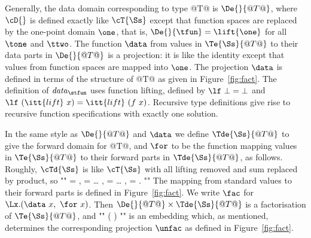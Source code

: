 \documentclass[11pt]{article}
\begin{document}
Generally, the data domain corresponding to type @T@ is $\De{}{@T@}$,
where $\cD{}$ is defined exactly like $\cT{\Ss}$ except that function
spaces are replaced by the one-point domain $\one$, that is,
$\De{}{\tfun}=\lift{\one}$ for all $\tone$ and $\ttwo$.  
The function $\data$ from values in
$\Te{\Ss}{@T@}$ to their data parts in $\De{}{@T@}$ is a projection:
it is like the identity except that values from function spaces are
mapped into $\one$.  The projection $\data$ is defined in terms of the
structure of @T@ as given in Figure~\ref{fig:fact}.
The definition of ${\it{}data}_{\stfun}$ uses function lifting, 
defined by $\lf~\bot=\bot$
and $\lf~(\itt{lift}~x)=\itt{lift}~(f~x)$.  Recursive type definitions
give rise to recursive function specifications with exactly one solution.

In the same style as  $\De{}{@T@}$ and $\data$ we define
$\Tde{\Ss}{@T@}$ to give the forward domain for @T@, and $\for$ to be
the function mapping values in $\Te{\Ss}{@T@}$ to their forward parts
in $\Tde{\Ss}{@T@}$, as follows.  Roughly, $\cTd{\Ss}$ is like
$\cT{\Ss}$ with all lifting removed and sum replaced by product, so
""
	\Tde{\Ss}{\tint} = \one ,\espace
	\Tde{\Ss}{\tprod} = \Tde{\Ss}{\tone} \times \ldots \times \Tde{\Ss}{\tn} ,\espace
	\Tde{\Ss}{\tsum} = \Tde{\Ss}{\tone} \times \ldots \times \Tde{\Ss}{\tn} ,\espace
	\Tde{\Ss}{\tfun} = \Te{\Ss}{\tone} \fto \Te{\Ss}{\ttwo} .
""
The mapping from standard values to their forward parts is defined in
Figure~\ref{fig:fact}.
We write $\fac$ for $\Lx.(\data~x,\ \for~x)$.  Then
$\De{}{@T@}\times\Tde{\Ss}{@T@}$ is a factorisation of
$\Te{\Ss}{@T@}$, and
""
	\fac \in {} \fto ( \times {})
""
is an embedding which, as mentioned, determines the corresponding projection
$\unfac$ as defined in Figure~\ref{fig:fact}.
\end{document}
